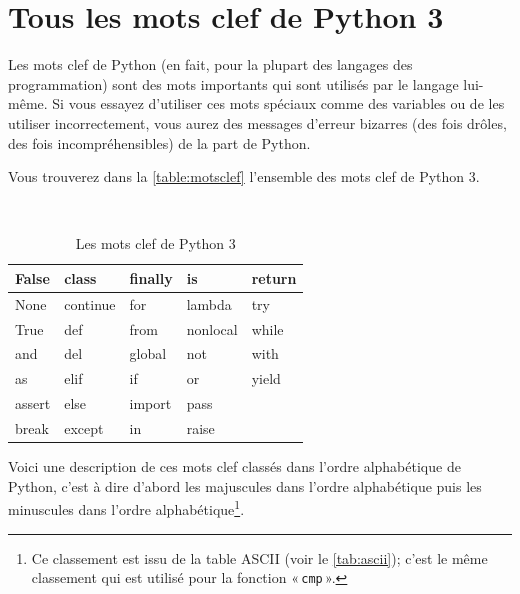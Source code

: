 




\chapter{Tous les mots clef de Python 3}\label{app:motsclef}

Les mots clef de Python (en fait, pour la plupart des langages des programmation) sont des mots importants qui sont utilisés par le langage lui-même. Si vous essayez d'utiliser ces mots spéciaux comme des variables ou de les utiliser incorrectement, vous aurez des messages d'erreur bizarres (des fois drôles, des fois incompréhensibles) de la part de Python. 

Vous trouverez dans la \autoref{table:motsclef} l'ensemble des mots clef de Python 3.

\begin{table}[h!]
\tt
\centering
\begin{tabular}{|l|l|l|l|l|}
\hline False &   class  &    finally &   is    &     return  \\ 
\hline  None   &    continue &  for &       lambda &    try  \\ 
\hline  True  &     def  &      from  &     nonlocal  & while  \\ 
\hline  and    &    del   &     global &    not   &     with \\ 
\hline  as    &     elif  &     if   &      or   &      yield  \\ 
\hline  assert  &   else   &    import   &  pass  & \\ 
\hline  break &      except   &  in    &     raise  &\\ 
\hline 
\end{tabular} 
\rm
\caption{Les mots clef de Python 3}\label{table:motsclef}
\end{table}

Voici une description de ces mots clef classés dans l'ordre alphabétique  de Python, c'est à dire d'abord les majuscules dans l'ordre alphabétique puis les minuscules dans l'ordre alphabétique\footnote{Ce classement est issu de la table ASCII (voir le \autoref{tab:ascii}); c'est le même classement qui est utilisé pour la fonction « \texttt{cmp} ».}. 

